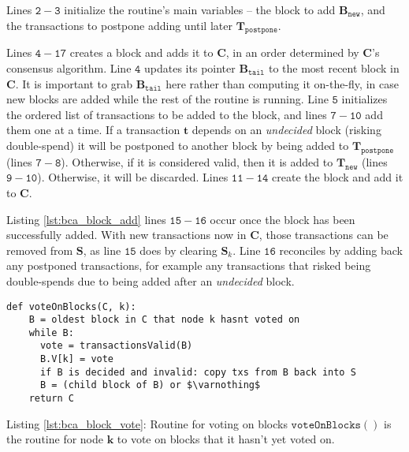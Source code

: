 Lines $\mathtt{2-3}$ initialize the routine’s main variables – the block to add $\mathbf{B}_{\mathtt{new}}$, and the transactions to postpone adding until later $\mathbf{T}_{\mathtt{postpone}}$.

Lines $\mathtt{4-17}$ creates a block and adds it to $\mathbf{C}$, in an order determined by $\mathbf{C}$’s consensus algorithm.
Line $\mathtt{4}$ updates its pointer $\mathbf{B}_{\mathtt{tail}}$ to the most recent block in $\mathbf{C}$.
It is important to grab $\mathbf{B}_{\mathtt{tail}}$ here rather than computing it on-the-fly, in case new blocks are added while the rest of the routine is running.
Line $\mathtt{5}$ initializes the ordered list of transactions to be added to the block, and lines $\mathtt{7-10}$ add them one at a time.
If a transaction $\mathbf{t}$ depends on an \textsf{\textit{undecided}} block (risking double-spend) it will be postponed to another block by being added to $\mathbf{T}_{\mathtt{postpone}}$ (lines $\mathtt{7-8}$).
Otherwise, if it is considered valid, then it is added to $\mathbf{T}_{\mathtt{new}}$ (lines $\mathtt{9-10}$).
Otherwise, it will be discarded. Lines $\mathtt{11-14}$ create the block and add it to $\mathbf{C}$.

Listing \ref{lst:bca_block_add} lines $\mathtt{15-16}$ occur once the block has been successfully added. With new transactions now in $\mathbf{C}$, those transactions can be removed from $\mathbf{S}$, as line $\mathtt{15}$ does by clearing $\mathbf{S}_k$.
Line $\mathtt{16}$ reconciles by adding back any postponed transactions, for example any transactions that risked being double-spends due to being added after an \textsf{\textit{undecided}} block.

\begin{minipage}{\linewidth}
  \begin{lstlisting}[caption={Routine for voting on blocks.}, label={lst:bca_block_vote}, style=python, mathescape=true]
  def voteOnBlocks(C, k): 
    B = oldest block in C that node k hasnt voted on
    while B: 
      vote = transactionsValid(B)
      B.V[k] = vote
      if B is decided and invalid: copy txs from B back into S 
      B = (child block of B) or $\varnothing$
    return C
  \end{lstlisting}
\end{minipage}

\noindent Listing \ref{lst:bca_block_vote}: Routine for voting on blocks $\mathtt{voteOnBlocks()}$ is the routine for node $\mathbf{k}$ to vote on blocks that it hasn’t yet voted on.

